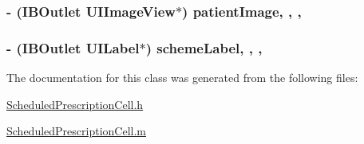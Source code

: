 \subsubsection[{patient\+Image}]{\setlength{\rightskip}{0pt plus 5cm}-\/ (I\+B\+Outlet U\+I\+Image\+View$\ast$) patient\+Image\hspace{0.3cm}{\ttfamily [read]}, {\ttfamily [write]}, {\ttfamily [nonatomic]}, {\ttfamily [weak]}}\label{interface_scheduled_prescription_cell_a79ab62aca7d99b031bcc1206b5f812d1}
\hypertarget{interface_scheduled_prescription_cell_a81fb8091fc4592db2b05250a6e5d4882}{}
\subsubsection[{scheme\+Label}]{\setlength{\rightskip}{0pt plus 5cm}-\/ (I\+B\+Outlet U\+I\+Label$\ast$) scheme\+Label\hspace{0.3cm}{\ttfamily [read]}, {\ttfamily [write]}, {\ttfamily [nonatomic]}, {\ttfamily [weak]}}\label{interface_scheduled_prescription_cell_a81fb8091fc4592db2b05250a6e5d4882}


The documentation for this class was generated from the following files\+:\begin{DoxyCompactItemize}
\item 
\hyperlink{_scheduled_prescription_cell_8h}{Scheduled\+Prescription\+Cell.\+h}\item 
\hyperlink{_scheduled_prescription_cell_8m}{Scheduled\+Prescription\+Cell.\+m}\end{DoxyCompactItemize}
